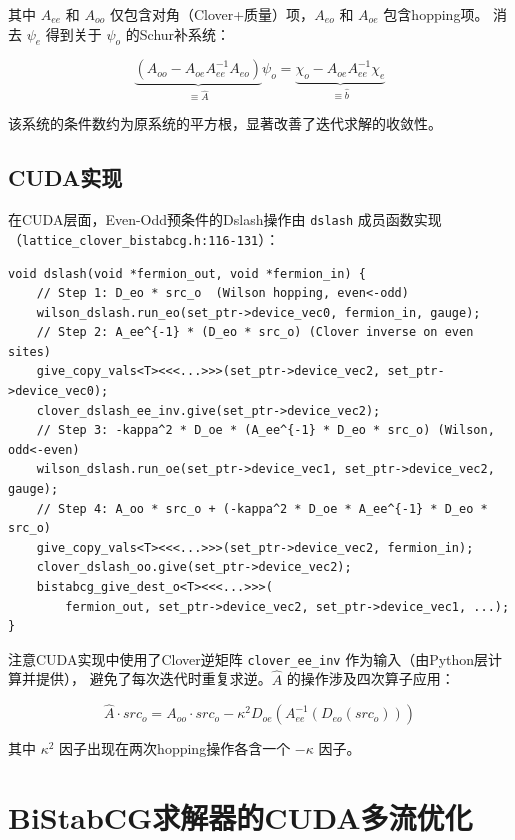 \documentclass[11pt,a4paper]{article}
\begin{document}
其中 $A_{ee}$ 和 $A_{oo}$ 仅包含对角（Clover+质量）项，$A_{eo}$ 和 $A_{oe}$ 包含hopping项。
消去 $\psi_e$ 得到关于 $\psi_o$ 的Schur补系统：

\begin{equation}
\underbrace{(A_{oo} - A_{oe}A_{ee}^{-1}A_{eo})}_{\equiv \hat{A}}\psi_o = \underbrace{\chi_o - A_{oe}A_{ee}^{-1}\chi_e}_{\equiv \hat{b}}
\end{equation}

该系统的条件数约为原系统的平方根，显著改善了迭代求解的收敛性。

\subsection{CUDA实现}

在CUDA层面，Even-Odd预条件的Dslash操作由 \texttt{dslash} 成员函数实现（\texttt{lattice\_clover\_bistabcg.h:116-131}）：

\begin{lstlisting}[style=cppstyle]
void dslash(void *fermion_out, void *fermion_in) {
    // Step 1: D_eo * src_o  (Wilson hopping, even<-odd)
    wilson_dslash.run_eo(set_ptr->device_vec0, fermion_in, gauge);
    // Step 2: A_ee^{-1} * (D_eo * src_o) (Clover inverse on even sites)
    give_copy_vals<T><<<...>>>(set_ptr->device_vec2, set_ptr->device_vec0);
    clover_dslash_ee_inv.give(set_ptr->device_vec2);
    // Step 3: -kappa^2 * D_oe * (A_ee^{-1} * D_eo * src_o) (Wilson, odd<-even)
    wilson_dslash.run_oe(set_ptr->device_vec1, set_ptr->device_vec2, gauge);
    // Step 4: A_oo * src_o + (-kappa^2 * D_oe * A_ee^{-1} * D_eo * src_o)
    give_copy_vals<T><<<...>>>(set_ptr->device_vec2, fermion_in);
    clover_dslash_oo.give(set_ptr->device_vec2);
    bistabcg_give_dest_o<T><<<...>>>(
        fermion_out, set_ptr->device_vec2, set_ptr->device_vec1, ...);
}
\end{lstlisting}

注意CUDA实现中使用了Clover逆矩阵 \texttt{clover\_ee\_inv} 作为输入（由Python层计算并提供），
避免了每次迭代时重复求逆。$\hat{A}$ 的操作涉及四次算子应用：

\begin{equation}
\hat{A} \cdot src_o = A_{oo} \cdot src_o - \kappa^2 D_{oe}(A_{ee}^{-1}(D_{eo}(src_o)))
\end{equation}

其中 $\kappa^2$ 因子出现在两次hopping操作各含一个 $-\kappa$ 因子。

\section{BiStabCG求解器的CUDA多流优化}
\end{document}
